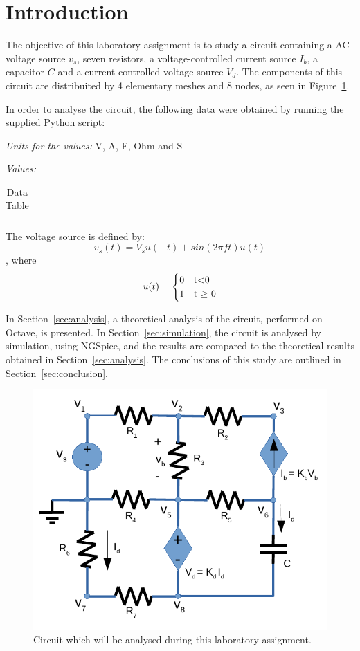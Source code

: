 \section{Introduction}
\label{sec:introduction}
The objective of this laboratory assignment is to study a circuit containing a
AC voltage source $v_s$, seven resistors, a voltage-controlled current source $I_b$, a capacitor $C$
and a current-controlled voltage source $V_d$. The components of this circuit are distribuited 
by 4 elementary meshes and 8 nodes, as seen in Figure~\ref{fig:circuit}. 

In order to analyse the circuit, the following data were obtained by running the supplied Python script: 

\textit{Units for the values:} V, A, F, Ohm and S\par
\textit{Values:}
\begin{table}[H]
  \centering
  \begin{tabular}{|l|r|}
    \hline    
    
  \end{tabular}
  \caption{Data Table}
  \label{tab:datatab}
\end{table}

\par The voltage source is defined by:
\begin{equation}
v_s(t) = V_s u(-t) + sin(2 \pi f t)u(t)
\label {equation:voltsource}
\end{equation}
, where
\begin{equation}
u(t)=
\begin{cases}
0 & $t$ < $0$ \\
1 & $t $\geq$ 0$
\end{cases}
\label {eq:ut}
\end{equation}

In Section~\ref{sec:analysis}, a theoretical analysis of the circuit, 
performed on Octave, is presented. In Section~\ref{sec:simulation}, the 
circuit is analysed by simulation, using NGSpice, and the results are compared to 
the theoretical results obtained in Section~\ref{sec:analysis}. The conclusions 
of this study are outlined in Section~\ref{sec:conclusion}.

\begin{figure}[H] \centering
\includegraphics[width=0.4\linewidth]{circuit.pdf}
\caption{Circuit which will be analysed during this laboratory assignment.}
\label{fig:circuit}
\end{figure}

